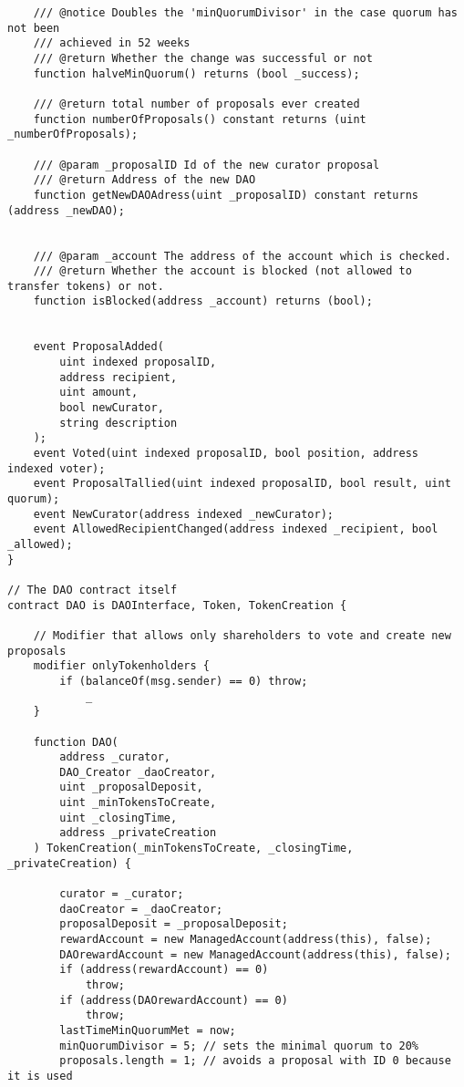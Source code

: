 \documentclass[9pt,oneside]{amsart}
\begin{document}
\begin{appendix}
\begin{verbatim}
    /// @notice Doubles the 'minQuorumDivisor' in the case quorum has not been
    /// achieved in 52 weeks
    /// @return Whether the change was successful or not
    function halveMinQuorum() returns (bool _success);

    /// @return total number of proposals ever created
    function numberOfProposals() constant returns (uint _numberOfProposals);

    /// @param _proposalID Id of the new curator proposal
    /// @return Address of the new DAO
    function getNewDAOAdress(uint _proposalID) constant returns (address _newDAO);


    /// @param _account The address of the account which is checked.
    /// @return Whether the account is blocked (not allowed to transfer tokens) or not.
    function isBlocked(address _account) returns (bool);


    event ProposalAdded(
        uint indexed proposalID,
        address recipient,
        uint amount,
        bool newCurator,
        string description
    );
    event Voted(uint indexed proposalID, bool position, address indexed voter);
    event ProposalTallied(uint indexed proposalID, bool result, uint quorum);
    event NewCurator(address indexed _newCurator);
    event AllowedRecipientChanged(address indexed _recipient, bool _allowed);
}

// The DAO contract itself
contract DAO is DAOInterface, Token, TokenCreation {

    // Modifier that allows only shareholders to vote and create new proposals
    modifier onlyTokenholders {
        if (balanceOf(msg.sender) == 0) throw;
            _
    }

    function DAO(
        address _curator,
        DAO_Creator _daoCreator,
        uint _proposalDeposit,
        uint _minTokensToCreate,
        uint _closingTime,
        address _privateCreation
    ) TokenCreation(_minTokensToCreate, _closingTime, _privateCreation) {

        curator = _curator;
        daoCreator = _daoCreator;
        proposalDeposit = _proposalDeposit;
        rewardAccount = new ManagedAccount(address(this), false);
        DAOrewardAccount = new ManagedAccount(address(this), false);
        if (address(rewardAccount) == 0)
            throw;
        if (address(DAOrewardAccount) == 0)
            throw;
        lastTimeMinQuorumMet = now;
        minQuorumDivisor = 5; // sets the minimal quorum to 20%
        proposals.length = 1; // avoids a proposal with ID 0 because it is used


\end{verbatim}
\end{appendix}
\end{document}
